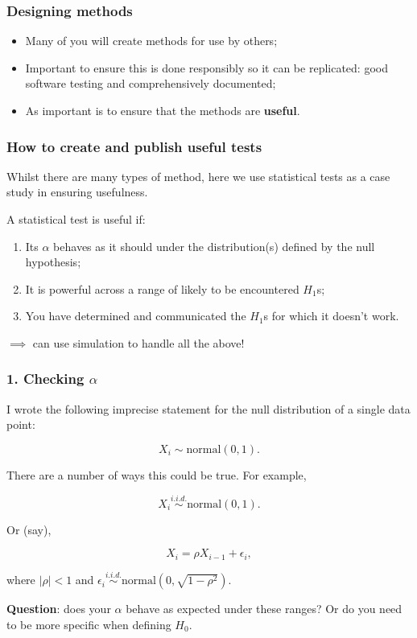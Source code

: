 \documentclass[handout]{beamer}
\begin{document}
\begin{frame}
	\frametitle{Designing methods}
	
	\begin{itemize}
		\item Many of you will create methods for use by others;
		\item Important to ensure this is done responsibly so it can be replicated: good software testing and comprehensively documented;
		\item As important is to ensure that the methods are \textbf{useful}.
	\end{itemize}
	
\end{frame}

\begin{frame}
	\frametitle{How to create and publish useful tests}
	
	Whilst there are many types of method, here we use statistical tests as a case study in ensuring usefulness.
	
	\vspace{0.5cm}
	
	A statistical test is useful if:
	
	\begin{enumerate}
		\item Its $\alpha$ behaves as it should under the distribution(s) defined by the null hypothesis;
		\item It is powerful across a range of likely to be encountered $H_1$s;
		\item You have determined and communicated the $H_1$s for which it doesn't work.
	\end{enumerate}
	
	$\implies$ can use simulation to handle all the above!
	
\end{frame}

\begin{frame}
	\frametitle{1. Checking $\alpha$}
	
	I wrote the following imprecise statement for the null distribution of a single data point:
	
	\begin{equation}
	X_i \sim \text{normal}(0, 1).
	\end{equation}
	
	There are a number of ways this could be true. For example,
	
	\begin{equation}
	X_i \stackrel{i.i.d.}{\sim} \text{normal}(0, 1).
	\end{equation}	
	
	Or (say),
	
	\begin{equation}
	X_i = \rho X_{i-1} + \epsilon_i,
	\end{equation}
	
	where $|\rho|<1$ and $\epsilon_i \stackrel{i.i.d.}{\sim} \text{normal}(0,\sqrt{1-\rho^2})$.
	
	\textbf{Question}: does your $\alpha$ behave as expected under these ranges? Or do you need to be more specific when defining $H_0$.
	
\end{frame}
\end{document}
